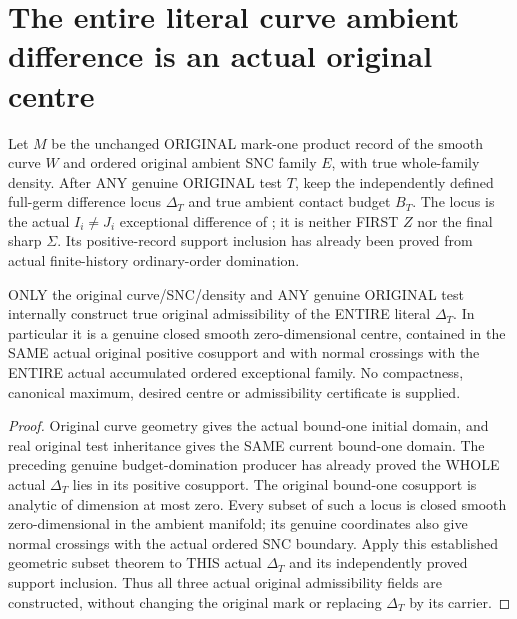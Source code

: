 \section{The entire literal curve ambient difference is an actual original centre}

Let $M$ be the unchanged ORIGINAL mark-one product record of the smooth
curve $W$ and ordered original ambient SNC family $E$, with true whole-family
density. After ANY genuine ORIGINAL test $T$, keep the independently defined
full-germ difference locus $\Delta_T$ and true ambient contact budget $B_T$.
The locus is the actual $I_i\ne J_i$ exceptional difference of
\cite[\S12]{bierstone-milman97-invent-math}; it is neither FIRST $Z$ nor
the final sharp $\Sigma$. Its positive-record support inclusion has already
been proved from actual finite-history ordinary-order domination.

\begin{theorem}
\label{hir:sharp-original-curve-whole-ambient-difference-admissible}
\leanok
ONLY the original curve/SNC/density and ANY genuine ORIGINAL test internally
construct true original admissibility of the ENTIRE literal $\Delta_T$.
In particular it is a genuine closed smooth zero-dimensional centre,
contained in the SAME actual original positive cosupport and with normal
crossings with the ENTIRE actual accumulated ordered exceptional family.
No compactness, canonical maximum, desired centre or admissibility
certificate is supplied.
\end{theorem}
\begin{proof}
Original curve geometry gives the actual bound-one initial domain, and
real original test inheritance gives the SAME current bound-one domain.
The preceding genuine budget-domination producer has already proved the
WHOLE actual $\Delta_T$ lies in its positive cosupport. The original
bound-one cosupport is analytic of dimension at most zero. Every subset
of such a locus is closed smooth zero-dimensional in the ambient manifold;
its genuine coordinates also give normal crossings with the actual
ordered SNC boundary. Apply this established geometric subset theorem
to THIS actual $\Delta_T$ and its independently proved support inclusion.
Thus all three actual original admissibility fields are constructed,
without changing the original mark or replacing $\Delta_T$ by its carrier.
\end{proof}

